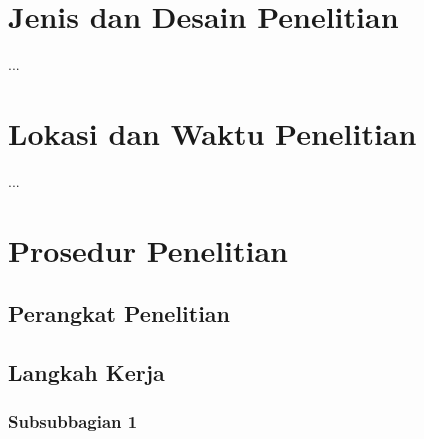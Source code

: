 \section{Jenis dan Desain Penelitian}

...


\section{Lokasi dan Waktu Penelitian}

...


\section{Prosedur Penelitian}

\subsection{Perangkat Penelitian}



\subsection{Langkah Kerja}

\vspace{3mm}

\subsubsection{Subsubbagian 1}



